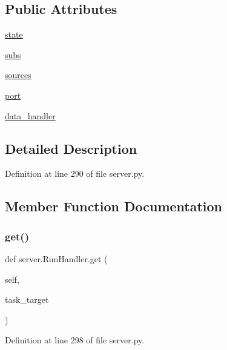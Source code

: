 \subsection*{Public Attributes}
\begin{DoxyCompactItemize}
\item 
\hyperlink{classserver_1_1RunHandler_ad9dcf16819e0f4297aea0e6512d6a65c}{state}
\item 
\hyperlink{classserver_1_1RunHandler_aa4cf37384b9e744045ff194c8dd2ccbe}{subs}
\item 
\hyperlink{classserver_1_1RunHandler_a204368b0f478f5bb004084b79d3a5c38}{sources}
\item 
\hyperlink{classserver_1_1RunHandler_a4fb5d23f976a5ada0b5647a78f162400}{port}
\item 
\hyperlink{classserver_1_1RunHandler_a977e83ee067ba61e59ff882a8e5b8e8b}{data\+\_\+handler}
\end{DoxyCompactItemize}


\subsection{Detailed Description}


Definition at line 290 of file server.\+py.



\subsection{Member Function Documentation}
\mbox{\label{classserver_1_1RunHandler_a3dd94b1f7d68486782facb8bdbc74957}} 
\subsubsection{\texorpdfstring{get()}{get()}}
{\footnotesize\ttfamily def server.\+Run\+Handler.\+get (\begin{DoxyParamCaption}\item[{}]{self,  }\item[{}]{task\+\_\+target }\end{DoxyParamCaption})}



Definition at line 298 of file server.\+py.



